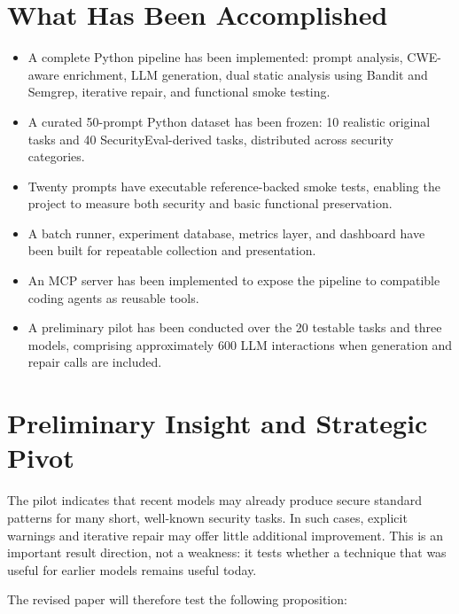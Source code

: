 \documentclass[11pt,a4paper]{article}
\begin{document}
\section{What Has Been Accomplished}
\begin{itemize}
\item A complete Python pipeline has been implemented: prompt analysis, CWE-aware enrichment, LLM generation, dual static analysis using Bandit and Semgrep, iterative repair, and functional smoke testing.
\item A curated 50-prompt Python dataset has been frozen: 10 realistic original tasks and 40 SecurityEval-derived tasks, distributed across security categories.
\item Twenty prompts have executable reference-backed smoke tests, enabling the project to measure both security and basic functional preservation.
\item A batch runner, experiment database, metrics layer, and dashboard have been built for repeatable collection and presentation.
\item An MCP server has been implemented to expose the pipeline to compatible coding agents as reusable tools.
\item A preliminary pilot has been conducted over the 20 testable tasks and three models, comprising approximately 600 LLM interactions when generation and repair calls are included.
\end{itemize}

\section{Preliminary Insight and Strategic Pivot}
The pilot indicates that recent models may already produce secure standard patterns for many short, well-known security tasks. In such cases, explicit warnings and iterative repair may offer little additional improvement. This is an important result direction, not a weakness: it tests whether a technique that was useful for earlier models remains useful today.

The revised paper will therefore test the following proposition:

\begin{center}
\end{center}
\end{document}
